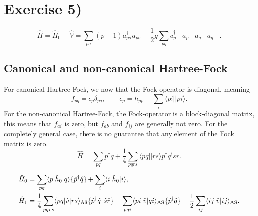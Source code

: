 \documentclass[a4paper, 11pt, notitlepage, english]{article}
\newcommand{\brakket}[2]{\langle #1 || #2 \rangle}
\newcommand{\op}[1]{\hat{#1}}
\newcommand{\braopket}[3]{\langle #1 | {#2} | #3 \rangle}
\newcommand{\eps}{\epsilon}
\begin{document}
\clearpage

\section*{Exercise 5)}







\clearpage







$$\op{H} = \op{H}_0 + \op{V} = \sum_{p \sigma} (p-1)a_{p\sigma}^\dagger a_{p\sigma} 
 -\frac{1}{2}g \sum_{p q} a_{p+}^\dagger a_{p-}^\dagger a_{q-} a_{q+}.$$


\subsection*{Canonical and non-canonical Hartree-Fock}

For canonical Hartree-Fock, we now that the Fock-operator is diagonal, meaning
$$f_{pq} = \eps_p \delta_{pq}, \qquad \eps_p = h_{pp} + \sum_{i}\brakket{pi}{pi}.$$
For the non-canonical Hartree-Fock, the Fock-operator is a block-diagonal matrix, this means that $f_{ai}$ is zero, but $f_{ab}$ and $f_{ij}$ are generally not zero.
For the completely general case, there is no guarantee that any element of the Fock matrix is zero.
$$\op{H} = \sum_{pq} p^\dagger q + \frac{1}{4}\sum_{pqrs}\brakket{pq}{rs}p^\dagger q^\dagger s r.$$

\begin{align*}
\op{H}_0 &= \sum_{pq}\braopket{p}{\op{h}_0}{q}\{\op{p}^\dag \op{q}\} + \sum_{i}\braopket{i}{\op{h}_0}{i}, \\
\op{H}_1 &= \frac{1}{4}\sum_{pqrs} \braopket{pq}{\op{v}}{rs}_{\rm AS} \{\op{p}^\dag \op{q}^\dag \op{s}\op{r}\} + \sum_{pqi} \braopket{pi}{\op{v}}{qi}_{\rm AS} \{ \op{p}^\dag \op{q} \} + \frac{1}{2}\sum_{ij} \braopket{ij}{\op{v}}{ij}_{\rm AS}.
\end{align*}
\end{document}
